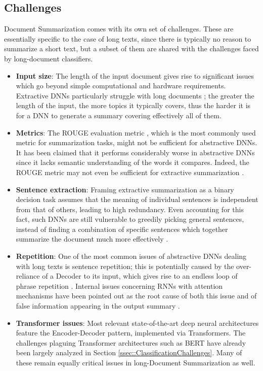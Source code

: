 \documentclass[preprint,review,12pt]{elsarticle}
\begin{document}
	
\subsection{Challenges}
\label{ssec::SummarizationChallenges}
Document Summarization comes with its own set of challenges. These are essentially specific to the case of long texts, since there is typically no reason to summarize a short text, but a subset of them are shared with the challenges faced by long-document classifiers.

\begin{itemize}
    \item \textbf{Input size}: The length of the input document gives rise to significant issues which go beyond simple computational and hardware requirements. Extractive DNNs particularly struggle with long documents \cite{xiao}; the greater the length of the input, the more topics it typically covers, thus the harder it is for a DNN to generate a summary covering effectively all of them.

    \item \textbf{Metrics}: The ROUGE evaluation metric \cite{rouge}, which is the most commonly used metric for summarization tasks, might not be sufficient for abstractive DNNs. It has been claimed that it performs considerably worse in abstractive DNNs since it lacks semantic understanding of the words it compares. Indeed, the ROUGE metric may not even be sufficient for extractive summarization \cite{akter}.

    \item \textbf{Sentence extraction}: Framing extractive summarization as a binary decision task assumes that the meaning of individual sentences is independent from that of others, leading to high redundancy. Even accounting for this fact, such DNNs are still vulnerable to greedily picking general sentences, instead of finding a combination of specific sentences which together summarize the document much more effectively \cite{matchsum}.

    \item \textbf{Repetition}: One of the most common issues of abstractive DNNs dealing with long texts is sentence repetition; this is potentially caused by the over-reliance of a Decoder to its input, which gives rise to an endless loop of phrase repetition \citet{abigail}. Internal issues concerning RNNs with attention mechanisms have been pointed out as the root cause of both this issue and of false information appearing in the output summary \citet{suleiman}.

    \item \textbf{Transformer issues}: Most relevant state-of-the-art deep neural architectures feature the Encoder-Decoder pattern, implemented via Transformers. The challenges plaguing Transformer architectures such as BERT have already been largely analyzed in Section \ref{ssec::ClassificationChallenges}. Many of these remain equally critical issues in long-Document Summarization as well.
\end{itemize}
	
\end{document}
